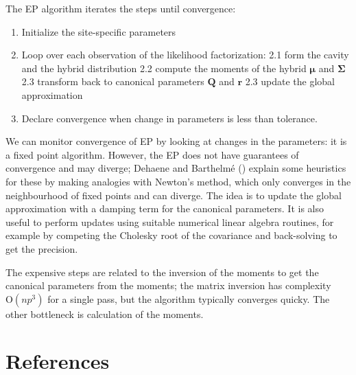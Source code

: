 \documentclass[
  11pt,
  letterpaper,
]{scrbook}
\providecommand{\tightlist}{%
  \setlength{\itemsep}{0pt}\setlength{\parskip}{0pt}}\usepackage{longtable,booktabs,array}
\theoremstyle{plain}
\theoremstyle{definition}
\theoremstyle{definition}
\theoremstyle{plain}
\theoremstyle{plain}
\theoremstyle{definition}
\theoremstyle{remark}
\begin{document}
The EP algorithm iterates the steps until convergence:

\begin{enumerate}
\def\labelenumi{\arabic{enumi}.}
\tightlist
\item
  Initialize the site-specific parameters
\item
  Loop over each observation of the likelihood factorization: 2.1 form
  the cavity and the hybrid distribution 2.2 compute the moments of the
  hybrid \(\boldsymbol{\mu}\) and \(\boldsymbol{\Sigma}\) 2.3 transform
  back to canonical parameters \(\mathbf{Q}\) and \(\boldsymbol{r}\) 2.3
  update the global approximation
\item
  Declare convergence when change in parameters is less than tolerance.
\end{enumerate}

We can monitor convergence of EP by looking at changes in the
parameters: it is a fixed point algorithm. However, the EP does not have
guarantees of convergence and may diverge; Dehaene and Barthelmé
() explain some heuristics
for these by making analogies with Newton's method, which only converges
in the neighbourhood of fixed points and can diverge. The idea is to
update the global approximation with a damping term for the canonical
parameters. It is also useful to perform updates using suitable
numerical linear algebra routines, for example by competing the Cholesky
root of the covariance and back-solving to get the precision.

The expensive steps are related to the inversion of the moments to get
the canonical parameters from the moments; the matrix inversion has
complexity \(\mathrm{O}(np^3)\) for a single pass, but the algorithm
typically converges quicky. The other bottleneck is calculation of the
moments.


\chapter{References}\label{references}
\end{document}
